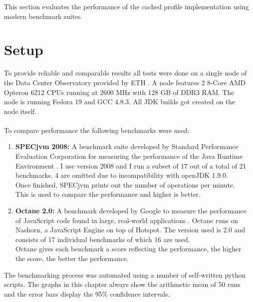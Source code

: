 This section evaluates the performance of the cached profile implementation using modern benchmark suites.
\section{Setup}
\label{s:perf_setup}
To provide reliable and comparable results all tests were done on a single node of the Data Center Observatory provided by ETH \cite{ethdco}.
A node features 2 8-Core AMD Opteron 6212 CPUs running at 2600 MHz with 128 GB of DDR3 RAM.
The node is running Fedora 19 and GCC 4.8.3. All JDK builds got created on the node itself.
\\\\
To compare performance the following benchmarks were used:
\begin{enumerate}
  \item \textbf{SPECjvm 2008:} A benchmark suite developed by Standard Performance Evaluation Corporation for measuring the performance of the Java Runtime Environment \cite{specjvm}.  I use version 2008 and I run a subset of 17 out of a total of 21 benchmarks. 4 are omitted due to incompatibility with openJDK 1.9.0.
  \\
  Once finished, SPECjvm prints out the number of operations per minute. This is used to compare the performance and higher is better.
  \item \textbf{Octane 2.0:} A benchmark developed by Google to measure the performance of JavaScript code found in large, real-world applications \cite{octane}. Octane runs on Nashorn, a JavaScript Engine on top of Hotspot. The version used is 2.0 and consists of 17 individual benchmarks of which 16 are used.
  \\
  Octane gives each benchmark a score reflecting the performance, the higher the score, the better the performance.
\end{enumerate}
The benchmarking process was automated using a number of self-written python scripts. The graphs in this chapter always show the arithmetic mean of 50 runs and the error bars display the 95\% confidence intervals.


